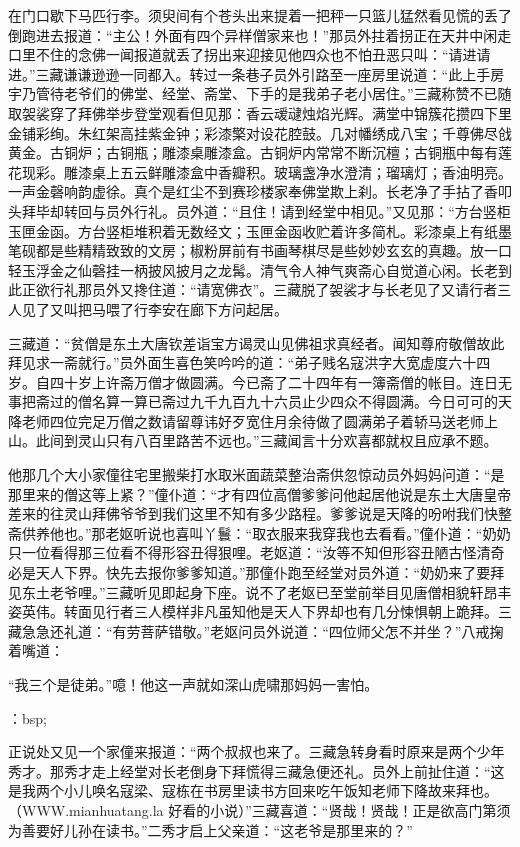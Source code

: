 \documentclass[12pt,UTF8]{ctexbook}
\begin{document}
{	在门口歇下马匹行李。须臾间有个苍头出来提着一把秤一只篮儿猛然看见慌的丢了倒跑进去报道：“主公！外面有四个异样僧家来也！”那员外拄着拐正在天井中闲走口里不住的念佛一闻报道就丢了拐出来迎接见他四众也不怕丑恶只叫：“请进请进。”三藏谦谦逊逊一同都入。转过一条巷子员外引路至一座房里说道：“此上手房宇乃管待老爷们的佛堂、经堂、斋堂、下手的是我弟子老小居住。”三藏称赞不已随取袈裟穿了拜佛举步登堂观看但见那：香云叆叇烛焰光辉。满堂中锦簇花攒四下里金铺彩绚。朱红架高挂紫金钟；彩漆檠对设花腔鼓。几对幡绣成八宝；千尊佛尽戗黄金。古铜炉；古铜瓶；雕漆桌雕漆盒。古铜炉内常常不断沉檀；古铜瓶中每有莲花现彩。雕漆桌上五云鲜雕漆盒中香瓣积。玻璃盏净水澄清；瑠璃灯；香油明亮。一声金磬响韵虚徐。真个是红尘不到赛珍楼家奉佛堂欺上刹。长老净了手拈了香叩头拜毕却转回与员外行礼。员外道：“且住！请到经堂中相见。”又见那：“方台竖柜玉匣金函。方台竖柜堆积着无数经文；玉匣金函收贮着许多简札。彩漆桌上有纸墨笔砚都是些精精致致的文房；椒粉屏前有书画琴棋尽是些妙妙玄玄的真趣。放一口轻玉浮金之仙磬挂一柄披风披月之龙髯。清气令人神气爽斋心自觉道心闲。长老到此正欲行礼那员外又搀住道：“请宽佛衣”。三藏脱了袈裟才与长老见了又请行者三人见了又叫把马喂了行李安在廊下方问起居。
	
	三藏道：“贫僧是东土大唐钦差诣宝方谒灵山见佛祖求真经者。闻知尊府敬僧故此拜见求一斋就行。”员外面生喜色笑吟吟的道：“弟子贱名寇洪字大宽虚度六十四岁。自四十岁上许斋万僧才做圆满。今已斋了二十四年有一簿斋僧的帐目。连日无事把斋过的僧名算一算已斋过九千九百九十六员止少四众不得圆满。今日可可的天降老师四位完足万僧之数请留尊讳好歹宽住月余待做了圆满弟子着轿马送老师上山。此间到灵山只有八百里路苦不远也。”三藏闻言十分欢喜都就权且应承不题。
	
	他那几个大小家僮往宅里搬柴打水取米面蔬菜整治斋供忽惊动员外妈妈问道：“是那里来的僧这等上紧？”僮仆道：“才有四位高僧爹爹问他起居他说是东土大唐皇帝差来的往灵山拜佛爷爷到我们这里不知有多少路程。爹爹说是天降的吩咐我们快整斋供养他也。”那老妪听说也喜叫丫鬟：“取衣服来我穿我也去看看。”僮仆道：“奶奶只一位看得那三位看不得形容丑得狠哩。老妪道：“汝等不知但形容丑陋古怪清奇必是天人下界。快先去报你爹爹知道。”那僮仆跑至经堂对员外道：“奶奶来了要拜见东土老爷哩。”三藏听见即起身下座。说不了老妪已至堂前举目见唐僧相貌轩昂丰姿英伟。转面见行者三人模样非凡虽知他是天人下界却也有几分悚惧朝上跪拜。三藏急急还礼道：“有劳菩萨错敬。”老妪问员外说道：“四位师父怎不并坐？”八戒掬着嘴道：
	
	“我三个是徒弟。”噫！他这一声就如深山虎啸那妈妈一害怕。
	
	：bsp;
	
	正说处又见一个家僮来报道：“两个叔叔也来了。三藏急转身看时原来是两个少年秀才。那秀才走上经堂对长老倒身下拜慌得三藏急便还礼。员外上前扯住道：“这是我两个小儿唤名寇梁、寇栋在书房里读书方回来吃午饭知老师下降故来拜也。（WWW.mianhuatang.la 好看的小说）”三藏喜道：“贤哉！贤哉！正是欲高门第须为善要好儿孙在读书。”二秀才启上父亲道：“这老爷是那里来的？”
	
}
\end{document}

